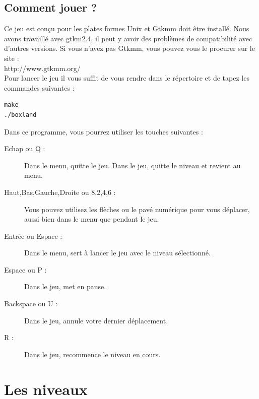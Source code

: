 \documentclass[a4paper,11pt,oneside]{article}
\newcommand{\file}[1]{\textsf{#1}}
\newcommand{\url}[1]{\selectlanguage{english}\file{#1}\selectlanguage{french}}
\begin{document}
\subsection{Comment jouer ?}
Ce jeu est conçu pour les plates formes Unix et Gtkmm doit être installé. Nous avons travaillé avec gtkm2.4, il peut y avoir des
problèmes de compatibilité avec d'autres versions. Si vous n'avez pas Gtkmm, vous pouvez vous le procurer sur le site : \\
\url{http://www.gtkmm.org/} \\
Pour lancer le jeu il vous suffit de vous rendre dans le répertoire et de tapez les commandes suivantes :
\begin{verbatim}
make
./boxland
\end{verbatim}
Dans ce programme, vous pourrez utiliser les touches suivantes :
\begin{description}
	\item[Echap ou Q :] Dans le menu, quitte le jeu. Dans le jeu, quitte le niveau et revient au menu.
	\item[Haut,Bas,Gauche,Droite ou 8,2,4,6 :] Vous pouvez utilisez les flèches ou le pavé numérique pour vous déplacer, aussi
	bien dans le menu que pendant le jeu.
	\item[Entrée ou Espace :] Dans le menu, sert à lancer le jeu avec le niveau sélectionné.
	\item[Espace ou P :] Dans le jeu, met en pause.
	\item[Backspace ou U :] Dans le jeu, annule votre dernier déplacement.
	\item[R :] Dans le jeu, recommence le niveau en cours.
\end{description}


\newpage
\section{Les niveaux}
\end{document}
